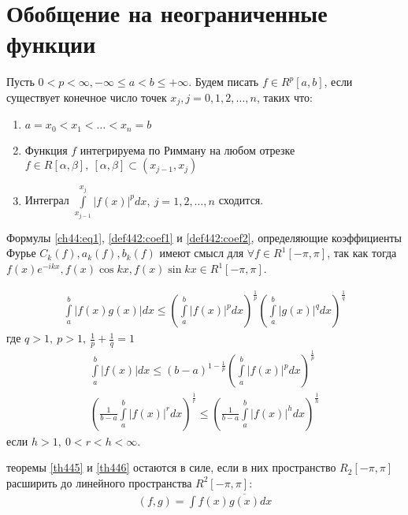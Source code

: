 \section{Обобщение на неограниченные функции}
\begin{definition}
  Пусть $0 < p < \infty, -\infty \leq a < b \leq + \infty$. Будем писать $f \in
  R^p[a,b]$, если существует конечное число точек $x_j, j = 0, 1, 2, \dots, n$,
  таких что:
  \begin{enumerate}
    \item $a = x_0 < x_1 < \dots < x_n = b$
    \item Функция $f$ интегрируема по Римману на любом отрезке $f \in R[\alpha,
      \beta], \ [\alpha, \beta] \subset (x_{j-1}, x_j)$
    \item Интеграл $\int\limits_{x_{j-1}}^{x_j} |f(x)|^p dx, \ j = 1, 2,
      \dots, n$ сходится.
  \end{enumerate}
\end{definition}

\begin{remark}
  Формулы \eqref{ch44:eq1}, \eqref{def442:coef1} и \eqref{def442:coef2},
  определяющие коэффициенты Фурье $C_k(f), a_k(f), b_k(f)$ имеют смысл для
  $\forall f \in R^1[-\pi, \pi]$, так как тогда $f(x) e^{-ikx}, f(x) \cos kx,
  f(x) \sin kx \in R^1[-\pi, \pi]$.
\end{remark}

\begin{definition}
  \begin{gather*}
    \int\limits_a^b |f(x) g(x)| dx \leq \left(\int\limits_a^b |f(x)|^p dx \right)
    ^{\frac{1}{p}}
    \left(\int\limits_a^b |g(x)|^q dx\right)^{\frac{1}{q}}
  \end{gather*}
  где $q > 1, \ p > 1, \ \frac{1}{p} + \frac{1}{q} = 1$
  \begin{gather*}
    \int\limits_a^b |f(x)| dx \leq (b - a)^{1 - \frac{1}{p}}
    \left(\int\limits_a^b |f(x)|^p dx \right)^{\frac{1}{p}} \\
    \left(\frac{1}{b-a} \int\limits_a^b |f(x)|^{r} dx \right)
    ^{\frac{1}{r}} \leq \left(\frac{1}{b-a} \int\limits_a^b |f(x)|^{h} dx
    \right) ^{\frac{1}{h}}
  \end{gather*}
  если $h > 1, \ 0 < r < h < \infty$.
\end{definition}

\begin{approval}
  теоремы \eqref{th445} и \eqref{th446} остаются в силе, если в них
  пространство $R_2[-\pi, \pi]$ расширить до линейного пространства
  $R^2[-\pi, \pi]$:
  \begin{gather*}
    (f, g) = \int f(x) \overline{g(x)} dx
  \end{gather*}
\end{approval}

